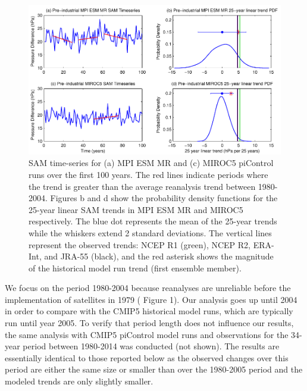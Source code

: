 \begin{figure}[t]
\noindent
\includegraphics[width=\linewidth]{figures/chapter-SHcirc/2014jgrl-p01.pdf}
\caption{SAM time-series for (a) MPI ESM MR and (c) MIROC5 piControl runs over
the first 100 years. The red lines indicate periods where the trend is greater
than the average reanalysis trend between 1980-2004. Figures b and d show the
probability density functions for the 25-year linear SAM trends in MPI ESM MR
and MIROC5  respectively. The blue dot represents the mean of the 25-year trends
while the whiskers extend 2 standard deviations. The vertical lines represent
the observed trends: NCEP R1 (green), NCEP R2, ERA-Int, and JRA-55 (black), and
the red asterisk shows the magnitude of the historical model run trend (first
ensemble member). }
\label{fig:ch2_fig1}
\end{figure}

We focus on the period 1980-2004 because reanalyses are unreliable before the
implementation of satellites in 1979 (\citet{Swart2012a} Figure 1). Our
analysis goes up until 2004 in order to compare with the CMIP5 historical model
runs, which are typically run until year 2005. To verify that period length does
not influence our results, the same analysis with CMIP5 piControl model runs and
observations for the 34-year period between 1980-2014 was conducted (not shown).
The results are essentially identical to those reported below as the observed
changes over this period are either the same size or smaller than over the
1980-2005 period and the modeled trends are only slightly smaller.

